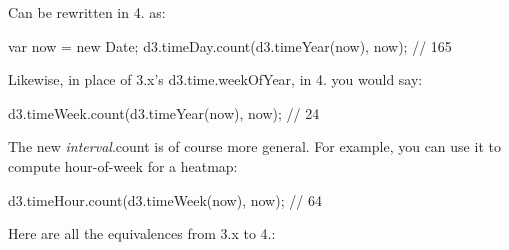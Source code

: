 Can be rewritten in 4. as\+:


\begin{DoxyCode}
var now = new Date;
d3.timeDay.count(d3.timeYear(now), now); // 165
\end{DoxyCode}


Likewise, in place of 3.\+x’s d3.\+time.\+week\+Of\+Year, in 4. you would say\+:


\begin{DoxyCode}
d3.timeWeek.count(d3.timeYear(now), now); // 24
\end{DoxyCode}


The new {\itshape interval}.count is of course more general. For example, you can use it to compute hour-\/of-\/week for a heatmap\+:


\begin{DoxyCode}
d3.timeHour.count(d3.timeWeek(now), now); // 64
\end{DoxyCode}


Here are all the equivalences from 3.\+x to 4.\+:


